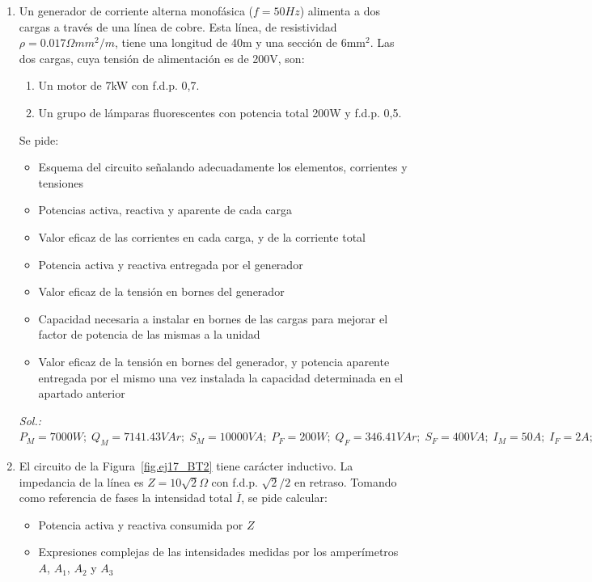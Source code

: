 \begin{enumerate}
\item Un generador de corriente alterna monofásica ($f = {50}{Hz}$) alimenta a dos cargas a través de una línea de cobre. Esta línea, de resistividad $\rho = {0.017}{\Omega mm^2/m}$, tiene una longitud de {40}{m} y una sección de {6}{mm$^2$}. Las dos cargas, cuya tensión de alimentación es de {200}{V}, son:
\begin{enumerate}
\item Un motor de {7}{kW} con f.d.p. {0,7}.
\item Un grupo de lámparas fluorescentes con potencia total {200}{W} y f.d.p. {0,5}.
\end{enumerate}
Se pide: 
\begin{itemize}
    \item Esquema del circuito señalando adecuadamente los elementos, corrientes y tensiones
    \item Potencias activa, reactiva y aparente de cada carga
    \item Valor eficaz de las corrientes en cada carga, y de la corriente total
    \item Potencia activa y reactiva entregada por el generador
    \item Valor eficaz de la tensión en bornes del generador
    \item Capacidad necesaria a instalar en bornes de las cargas para mejorar el factor de potencia de las mismas a la unidad
    \item Valor eficaz de la tensión en bornes del generador, y potencia aparente entregada por el mismo una vez instalada la capacidad determinada en el apartado anterior
\end{itemize}
\emph{Sol.: $P_M = {7000}{W};\; Q_M = {7141.43}{VAr};\; S_M ={10000}{VA};\; P_F = {200}{W};\;  Q_F = {346.41}{VAr};\; S_F ={400}{VA};\;I_M = {50}{A};\; I_F = {2}{A};\; I_T = {51.94}{A};\;P_g = {7811.50}{W};\; Q_g = {7487.8}{VAr};\; U_g = {208.33}{V}; C={595.86}{\mu F};\; U_g' = {207.92}{V};\; S_g' = {7485.12}{VA}$ }
\item El circuito de la Figura~\ref{fig.ej17_BT2} tiene carácter inductivo.  La impedancia de la línea es $Z={10\sqrt{2}}{\Omega}$ con
f.d.p. $\sqrt{2}/2$ en retraso. Tomando como referencia de fases la intensidad total $\overline{I}$, se pide calcular:
\begin{itemize}
\item Potencia activa y reactiva consumida por $Z$
\item Expresiones complejas de las intensidades medidas por los amperímetros $A$, $A_1$, $A_2$ y $A_3$ 

\end{itemize}
\end{enumerate}
